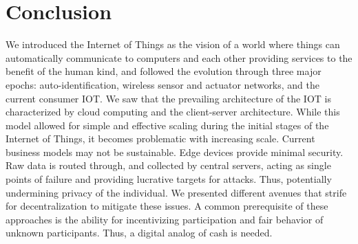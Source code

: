 

\section{Conclusion}

We introduced the Internet of Things as the vision of a world where things can automatically communicate to computers and each other providing services to the benefit of the human kind, and followed the evolution through three major epochs: auto-identification, wireless sensor and actuator networks, and the current consumer \ac{IOT}. We saw that the prevailing architecture of the \ac{IOT} is characterized by cloud computing and the client-server architecture. While this model allowed for simple and effective scaling during the initial stages of the Internet of Things, it becomes problematic with increasing scale. Current business models may not be sustainable. Edge devices provide minimal security. Raw data is routed through, and collected by central servers, acting as single points of failure and providing lucrative targets for attacks. Thus, potentially undermining privacy of the individual. We presented different avenues that strife for decentralization to mitigate these issues. A common prerequisite of these approaches is the ability for incentivizing participation and fair behavior of unknown participants. Thus, a digital analog of cash is needed. 

